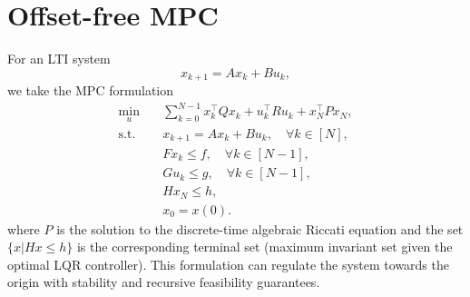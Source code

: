 \setcounter{section}{0}
\section{Offset-free MPC}
For an LTI system
\begin{equation*}
    x_{k+1} = Ax_k + Bu_k,
\end{equation*}
we take the MPC formulation
\begin{align*}
        \min_u \quad &\sum_{k = 0}^{N-1} x_k^{\top}Qx_k + u_k^{\top}Ru_k + x_N^{\top}Px_N,\\
    \text{s.t.}\quad &x_{k+1} =Ax_k + Bu_k, \quad\forall k \in [N],\\
    &Fx_k\leq f, \quad\forall k \in [N-1],\\
    &Gu_k\leq g, \quad\forall k \in [N-1],\\
    &Hx_N\leq h,\\
    &x_0 = x(0).
\end{align*}
where $P$ is the solution to the discrete-time algebraic Riccati equation and the set $\{x|Hx\leq h\}$ is the corresponding terminal set (maximum invariant set given the optimal LQR controller). This formulation can regulate the system towards the origin with stability and recursive feasibility guarantees.
